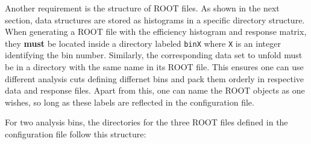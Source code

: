 Another requirement is the structure of ROOT files.
As shown in the next section, data structures are stored as histograms in a specific directory structure.
When generating a ROOT file with the efficiency histogram and response matrix, they {\bf must} be located inside 
a directory labeled \verb|binX| where \verb|X| is an integer identifying the bin number.
Similarly, the corresponding data set to unfold must be in a directory with the same name in its ROOT file.
This ensures one can use different analysis cuts defining differnet bins and pack them orderly in respective data and response files.
Apart from this, one can name the ROOT objects as one wishes, so long as these labels are reflected in the configuration file.

For two analysis bins, the directories for the three ROOT files defined in the configuration file follow this structure:


